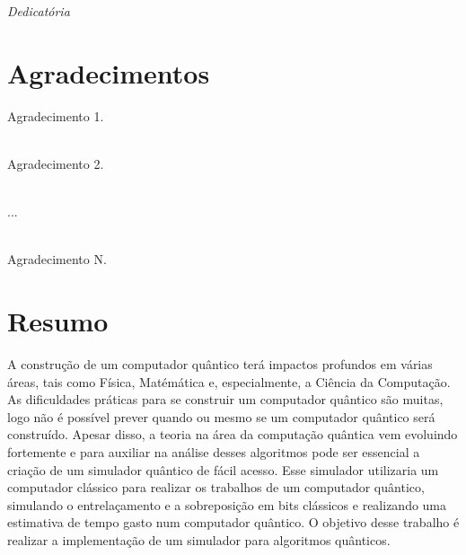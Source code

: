 \documentclass[a4paper, 12pt, oneside]{book}
\begin{document}
\newpage


\newpage


\begin{flushright}
\begin{minipage}{0.5\textwidth}

\vspace{15.0cm}

\emph{
Dedicatória
}

\end{minipage}
\end{flushright}


\chapter*{Agradecimentos}

\thispagestyle{myheadings}

\noindent

Agradecimento 1.

\ \\ 

Agradecimento 2.

\ \\ 

...

\ \\ 

Agradecimento N.


\chapter*{Resumo}

\thispagestyle{myheadings}

A construção de um computador quântico terá impactos profundos em várias áreas, tais como Física, Matémática e, especialmente, a Ciência da Computação. As dificuldades práticas para se construir um computador quântico são muitas, logo não é possível prever quando ou mesmo se um computador quântico será construído. Apesar disso, a teoria na área da computação quântica vem evoluindo fortemente e para auxiliar na análise desses algoritmos pode ser essencial a criação de um simulador quântico de fácil acesso. Esse simulador utilizaria um computador clássico para realizar os trabalhos de um computador quântico, simulando o entrelaçamento e a sobreposição em bits clássicos e realizando uma estimativa de tempo gasto num computador quântico. O objetivo desse trabalho é realizar a implementação de um simulador para algoritmos quânticos.
\end{document}
